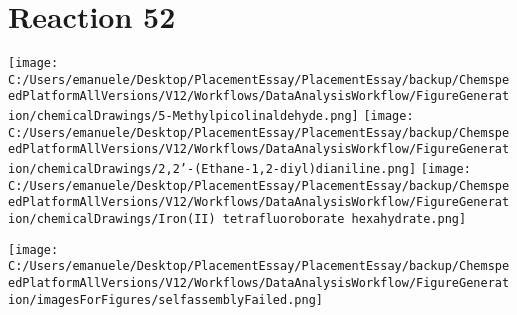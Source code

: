 \documentclass{article}%
\begin{document}
\section*{Reaction 52}%
%
\begin{scheme}[H]%
\begin{minipage}{0.5\textwidth}%
\texttt{[image: C:/Users/emanuele/Desktop/PlacementEssay/PlacementEssay/backup/ChemspeedPlatformAllVersions/V12/Workflows/DataAnalysisWorkflow/FigureGeneration/chemicalDrawings/5-Methylpicolinaldehyde.png]}%
\texttt{[image: C:/Users/emanuele/Desktop/PlacementEssay/PlacementEssay/backup/ChemspeedPlatformAllVersions/V12/Workflows/DataAnalysisWorkflow/FigureGeneration/chemicalDrawings/2,2'-(Ethane-1,2-diyl)dianiline.png]}%
\texttt{[image: C:/Users/emanuele/Desktop/PlacementEssay/PlacementEssay/backup/ChemspeedPlatformAllVersions/V12/Workflows/DataAnalysisWorkflow/FigureGeneration/chemicalDrawings/Iron(II) tetrafluoroborate hexahydrate.png]}%
\end{minipage}%
\begin{minipage}{0.5\textwidth}%
\begin{center}%
\texttt{[image: C:/Users/emanuele/Desktop/PlacementEssay/PlacementEssay/backup/ChemspeedPlatformAllVersions/V12/Workflows/DataAnalysisWorkflow/FigureGeneration/imagesForFigures/selfassemblyFailed.png]}%
\end{center}%
\end{minipage}%
\caption{Self-assembly of components 3, 20, with Iron(II) in a 3.0:1.5:1.0 molar ratio in CH$_3$CN at 60\textdegree C for 40h. These are the reagents (starting materials) for reaction 52.}%
\end{scheme}%
\end{document}
